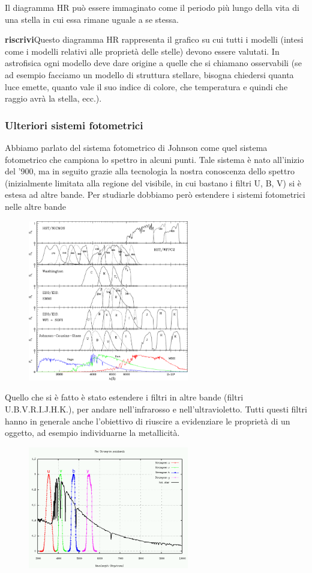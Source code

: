 Il diagramma HR può essere immaginato come il periodo più lungo della vita di una stella in cui essa rimane uguale a se stessa.

\textbf{riscrivi}Questo diagramma HR rappresenta il grafico su cui tutti i modelli (intesi come i modelli relativi alle proprietà delle stelle) devono essere valutati. In astrofisica ogni modello deve dare origine a quelle che si chiamano osservabili (se ad esempio facciamo un modello di struttura stellare, bisogna chiedersi quanta luce emette, quanto vale il suo indice di colore, che temperatura e quindi che raggio avrà la stella, ecc.). 

\subsubsection{Ulteriori sistemi fotometrici}

Abbiamo parlato del sistema fotometrico di Johnson come quel sistema fotometrico che campiona lo spettro in alcuni punti. Tale sistema è nato all'inizio del '900, ma in seguito grazie alla tecnologia la nostra conoscenza dello spettro (inizialmente limitata alla regione del visibile, in cui bastano i filtri U, B, V) si è estesa ad altre bande. Per studiarle dobbiamo però estendere i sistemi fotometrici nelle altre bande

\begin{figure}[H]
   \centering
   \includegraphics[width=7cm]{immagini/sistemi_fotometrici.png}
\end{figure}

Quello che si è fatto è stato estendere i filtri in altre bande (filtri U.B.V.R.I.J.H.K.), per andare nell'infrarosso e nell'ultravioletto. Tutti questi filtri hanno in generale anche l'obiettivo di riuscire a evidenziare le proprietà di un oggetto, ad esempio individuarne la metallicità.
\begin{figure}[H]
   \centering
   \includegraphics[width=7cm]{immagini/sistema_Stromgren.png}
\end{figure}

